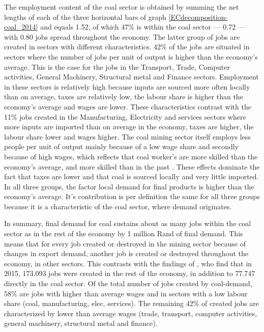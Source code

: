 \documentclass[12pt,english]{article}
\begin{document}
The employment content of the coal sector is obtained by summing the net lengths of each of the three horizontal bars of graph \ref{ECdecomposition-coal_2014} and equals 1.52, of which 47\% is within the coal sector --- 0.72 --- with 0.80 jobs spread throughout the economy. %
The latter group of jobs are created in sectors with different characteristics. 42\% of the jobs are situated in sectors where the number of jobs per unit of output is higher than the economy's average. This is the case for the jobs in the Transport, Trade, Computer activities, General Machinery, Structural metal and Finance sectors. Employment in these sectors is relatively high because inputs are sourced more often locally than on average, taxes are relatively low, the labour share is higher than the economy's average and wages are lower. These characteristics contrast with the 11\% jobs created in the Manufacturing, Electricity and services sectors where more inputs are imported than on average in the economy, taxes are higher, the labour share lower and wages higher. The coal mining sector itself employs less people per unit of output mainly because of a low wage share and secondly because of high wages, which reflects that coal worker's are more skilled than the economy's average, and more skilled than in the past \citep{burton2018coal}. These effects dominate the fact that taxes are lower and that coal is sourced locally and very little imported. In all three groups, the factor local demand for final products is higher than the economy's average. It's contribution is per definition the same for all three groups because it is a characteristic of the coal sector, where demand originates. %

In summary, final demand for coal sustains about as many jobs within the coal sector as in the rest of the economy by 1 million Rand of final demand. This means that for every job created or destroyed in the mining sector because of changes in export demand, another job is created or destroyed throughout the economy, in other sectors. This contrasts with the findings of \cite{ChamberofMines2018Strategy}, who find that in 2015, 173.093 jobs were created in the rest of the economy, in addition to 77.747 directly in the coal sector. Of the total number of jobs created by coal-demand, 58\% are jobs with higher than average wages and in sectors with a low labour share (coal, manufacturing, elec, services). The remaining 42\% of created jobs are characterized by lower than average wages (trade, transport, computer activities, general machinery, structural metal and finance). %
\end{document}
